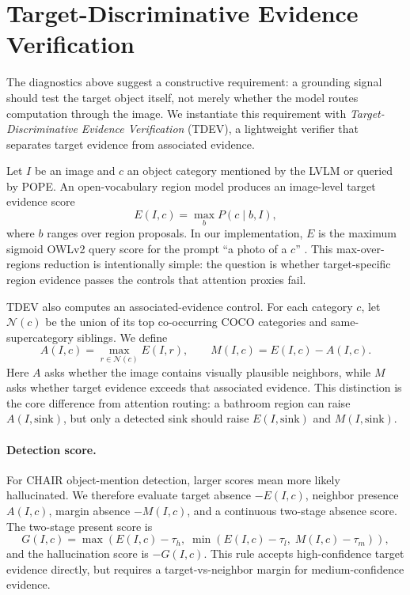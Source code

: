 \section{Target-Discriminative Evidence Verification}
\label{sec:tdev}

The diagnostics above suggest a constructive requirement: a grounding signal should test the target object itself, not merely whether the model routes computation through the image. We instantiate this requirement with \emph{Target-Discriminative Evidence Verification} (TDEV), a lightweight verifier that separates target evidence from associated evidence.

Let $I$ be an image and $c$ an object category mentioned by the LVLM or queried by POPE. An open-vocabulary region model produces an image-level target evidence score
\begin{equation}
E(I,c)=\max_b P(c\mid b,I),
\end{equation}
where $b$ ranges over region proposals. In our implementation, $E$ is the maximum sigmoid OWLv2 query score for the prompt ``a photo of a $c$'' \cite{minderer2023scaling}. This max-over-regions reduction is intentionally simple: the question is whether target-specific region evidence passes the controls that attention proxies fail.

TDEV also computes an associated-evidence control. For each category $c$, let $\mathcal{N}(c)$ be the union of its top co-occurring COCO categories and same-supercategory siblings. We define
\begin{equation}
A(I,c)=\max_{r\in\mathcal{N}(c)} E(I,r), \qquad M(I,c)=E(I,c)-A(I,c).
\end{equation}
Here $A$ asks whether the image contains visually plausible neighbors, while $M$ asks whether target evidence exceeds that associated evidence. This distinction is the core difference from attention routing: a bathroom region can raise $A(I,\text{sink})$, but only a detected sink should raise $E(I,\text{sink})$ and $M(I,\text{sink})$.

\paragraph{Detection score.}
For CHAIR object-mention detection, larger scores mean more likely hallucinated. We therefore evaluate target absence $-E(I,c)$, neighbor presence $A(I,c)$, margin absence $-M(I,c)$, and a continuous two-stage absence score. The two-stage present score is
\begin{equation}
G(I,c)=\max\left(E(I,c)-\tau_h,\; \min(E(I,c)-\tau_l,\; M(I,c)-\tau_m)\right),
\end{equation}
and the hallucination score is $-G(I,c)$. This rule accepts high-confidence target evidence directly, but requires a target-vs-neighbor margin for medium-confidence evidence.

